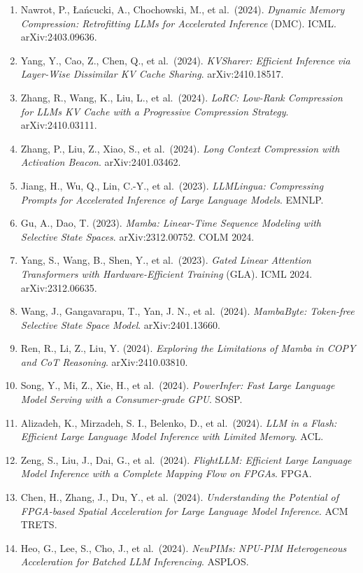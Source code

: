 \begin{enumerate}
\item
  Nawrot, P., Łańcucki, A., Chochowski, M., et al.~(2024). \emph{Dynamic Memory Compression: Retrofitting LLMs for Accelerated Inference} (DMC). ICML. arXiv:2403.09636.
\item
  Yang, Y., Cao, Z., Chen, Q., et al.~(2024). \emph{KVSharer: Efficient Inference via Layer-Wise Dissimilar KV Cache Sharing}. arXiv:2410.18517.
\item
  Zhang, R., Wang, K., Liu, L., et al.~(2024). \emph{LoRC: Low-Rank Compression for LLMs KV Cache with a Progressive Compression Strategy}. arXiv:2410.03111.
\item
  Zhang, P., Liu, Z., Xiao, S., et al.~(2024). \emph{Long Context Compression with Activation Beacon}. arXiv:2401.03462.
\item
  Jiang, H., Wu, Q., Lin, C.-Y., et al.~(2023). \emph{LLMLingua: Compressing Prompts for Accelerated Inference of Large Language Models}. EMNLP.
\item
  Gu, A., Dao, T. (2023). \emph{Mamba: Linear-Time Sequence Modeling with Selective State Spaces}. arXiv:2312.00752. COLM 2024.
\item
  Yang, S., Wang, B., Shen, Y., et al.~(2023). \emph{Gated Linear Attention Transformers with Hardware-Efficient Training} (GLA). ICML 2024. arXiv:2312.06635.
\item
  Wang, J., Gangavarapu, T., Yan, J. N., et al.~(2024). \emph{MambaByte: Token-free Selective State Space Model}. arXiv:2401.13660.
\item
  Ren, R., Li, Z., Liu, Y. (2024). \emph{Exploring the Limitations of Mamba in COPY and CoT Reasoning}. arXiv:2410.03810.
\item
  Song, Y., Mi, Z., Xie, H., et al.~(2024). \emph{PowerInfer: Fast Large Language Model Serving with a Consumer-grade GPU}. SOSP.
\item
  Alizadeh, K., Mirzadeh, S. I., Belenko, D., et al.~(2024). \emph{LLM in a Flash: Efficient Large Language Model Inference with Limited Memory}. ACL.
\item
  Zeng, S., Liu, J., Dai, G., et al.~(2024). \emph{FlightLLM: Efficient Large Language Model Inference with a Complete Mapping Flow on FPGAs}. FPGA.
\item
  Chen, H., Zhang, J., Du, Y., et al.~(2024). \emph{Understanding the Potential of FPGA-based Spatial Acceleration for Large Language Model Inference}. ACM TRETS.
\item
  Heo, G., Lee, S., Cho, J., et al.~(2024). \emph{NeuPIMs: NPU-PIM Heterogeneous Acceleration for Batched LLM Inferencing}. ASPLOS.

\end{enumerate}
